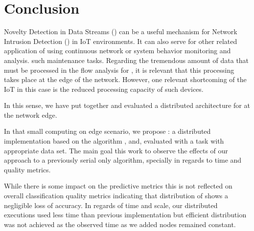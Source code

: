 
\section{Conclusion} 
\label{sec:conclusion}


Novelty Detection in Data Streams (\nd) can be a useful mechanism for Network
Intrusion Detection (\nids) in IoT environments. It can also serve for other related application of \nd using continuous
network or system behavior monitoring and analysis.
such maintenance tasks.
Regarding the tremendous amount of data that must be processed in the flow analysis for \nd, it 
is relevant that this processing takes place at the edge of the network. 
However, one relevant shortcoming of the IoT in this case is the reduced processing capacity of such devices. 

In this sense, we have put together and evaluated a distributed architecture for \nd at the network edge.

In that small computing on edge scenario, we propose \mfog: a distributed \nd
implementation based on the \nd algorithm \minas, and, evaluated with a \nids
task with appropriate data set.
The main goal this work  to observe the effects of our approach to a
previously serial only algorithm, specially in regards to time and quality
metrics.


While there is some impact on the predictive metrics this is not reflected on
overall classification quality metrics indicating that distribution of \minas
shows a negligible loss of accuracy.
In regards of time and scale, our distributed executions used less time than
previous implementation but efficient distribution was not achieved as the
observed time as we added nodes remained constant.

